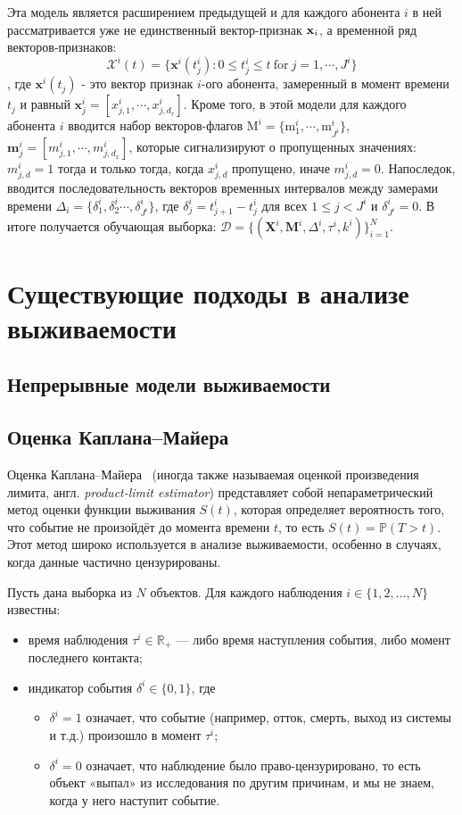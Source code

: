 \documentclass[a4paper,14pt,oneside,openany]{memoir}
\begin{document}
Эта модель является расширением предыдущей и для каждого абонента $i$ в ней рассматривается уже не единственный вектор-признак $\bold{x}_i$, а временной ряд векторов-признаков: 
$$\mathcal{X}^i(t)=\{\mathbf{x}^i(t_j^i):0\leq t_j^i\leq t\mathrm{~for~}j=1,\cdots,J^i\}$$, где $\mathbf{x}^i(t_j)$ - это вектор признак $i$-ого абонента, замеренный в момент времени $t_j$ и равный $\mathbf{x}_j^i=[x_{j,1}^{i},\cdots,x_{j,d_{r}}^{i}]$. Кроме того, в этой модели для каждого абонента $i$ вводится набор векторов-флагов $\mathrm{M}^i=\{\mathrm{m}_1^i,\cdots,\mathrm{m}_{J^i}^i\}$, $\mathbf{m}_j^i=[m_{j,1}^i,\cdots,m_{j,d_x}^i]$, которые сигнализируют о пропущенных значениях: $m_{j,d}^{i}=1$ тогда и только тогда, когда $x_{j,d}^{i}$ пропущено, иначе $m_{j,d}^{i}=0$. Напоследок, вводится последовательность векторов временных интервалов между замерами времени $\Delta_i = \{\delta_{1}^{i},\delta_{2}^{i}\cdots,\delta_{J^{i}}^{i}\}$, где $\delta_{j}^{i}=t_{j+1}^{i}-t_{j}^{i}$ для всех $1\leq j<J^{i}$ и $\delta_{J^i}^i=0$. В итоге получается обучающая выборка: $\mathcal{D}=\{(\mathbf{X}^{i},\mathbf{M}^{i},\Delta^{i},\tau^{i},k^{i})\}_{i=1}^{N}$.

\chapter{Существующие подходы в анализе выживаемости}

\section{Непрерывные модели выживаемости}

\section{Оценка Каплана--Майера}

Оценка Каплана--Майера~\cite{Kaplan1958} (иногда также называемая оценкой произведения лимита, англ. \textit{product-limit estimator}) представляет собой непараметрический метод оценки функции выживания $S(t)$, которая определяет вероятность того, что событие не произойдёт до момента времени $t$, то есть $S(t) = \mathbb{P}(T > t)$. Этот метод широко используется в анализе выживаемости, особенно в случаях, когда данные частично цензурированы.

Пусть дана выборка из $N$ объектов. Для каждого наблюдения $i \in \{1, 2, \dots, N\}$ известны:
\begin{itemize}
	\item время наблюдения $\tau^i \in \mathbb{R}_+$ — либо время наступления события, либо момент последнего контакта;
	\item индикатор события $\delta^i \in \{0, 1\}$, где
	\begin{itemize}
		\item $\delta^i = 1$ означает, что событие (например, отток, смерть, выход из системы и т.д.) произошло в момент $\tau^i$;
		\item $\delta^i = 0$ означает, что наблюдение было право-цензурировано, то есть объект «выпал» из исследования по другим причинам, и мы не знаем, когда у него наступит событие.
	\end{itemize}
\end{itemize}
\end{document}
